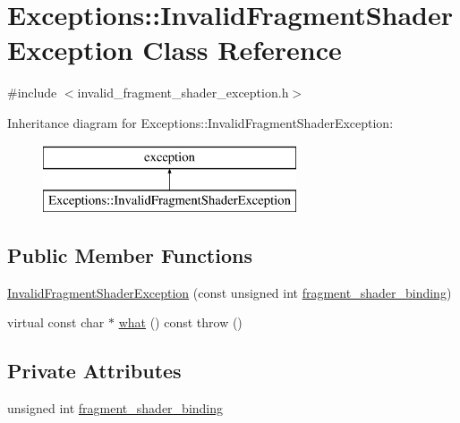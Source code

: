 \hypertarget{class_exceptions_1_1_invalid_fragment_shader_exception}{}\section{Exceptions\+:\+:Invalid\+Fragment\+Shader\+Exception Class Reference}
\label{class_exceptions_1_1_invalid_fragment_shader_exception}


{\ttfamily \#include $<$invalid\+\_\+fragment\+\_\+shader\+\_\+exception.\+h$>$}

Inheritance diagram for Exceptions\+:\+:Invalid\+Fragment\+Shader\+Exception\+:\begin{figure}[H]
\begin{center}
\leavevmode
\includegraphics[height=2.000000cm]{class_exceptions_1_1_invalid_fragment_shader_exception}
\end{center}
\end{figure}
\subsection*{Public Member Functions}
\begin{DoxyCompactItemize}
\item 
\hyperlink{class_exceptions_1_1_invalid_fragment_shader_exception_adc23c55b308ae7ef93d03a6eee4bda31}{Invalid\+Fragment\+Shader\+Exception} (const unsigned int \hyperlink{class_exceptions_1_1_invalid_fragment_shader_exception_a3b2f1a947996d185b7a8a5c669ebbc74}{fragment\+\_\+shader\+\_\+binding})
\item 
virtual const char $\ast$ \hyperlink{class_exceptions_1_1_invalid_fragment_shader_exception_a816958e8042838f5a7ea88cefb4ea86c}{what} () const   throw ()
\end{DoxyCompactItemize}
\subsection*{Private Attributes}
\begin{DoxyCompactItemize}
\item 
unsigned int \hyperlink{class_exceptions_1_1_invalid_fragment_shader_exception_a3b2f1a947996d185b7a8a5c669ebbc74}{fragment\+\_\+shader\+\_\+binding}
\end{DoxyCompactItemize}



